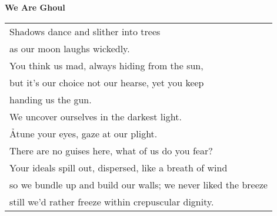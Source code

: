 \documentclass{article}
\begin{document}
\newcommand{\hh}{\hspace*{1ex}}
\begin{center}
\textbf{We Are Ghoul} \\
\vspace*{2ex}
\begin{tabular}{l}
Shadows dance and slither into trees \\
\hh as our moon laughs wickedly. \\
You think us mad, always hiding from the sun, \\
\hh but it's our choice not our hearse, yet you keep \\
\hh handing us the gun. \\
We uncover ourselves in the darkest light. \\
\h Atune your eyes, gaze at our plight. \\ %
There are no guises here, what of us do you fear? \\ %
Your ideals spill out, dispersed, like a breath of wind \\
\hh so we bundle up and build our walls; we never liked the breeze \\
\hh still we'd rather freeze within crepuscular dignity. \\ %
\end{tabular}
\end{center}
\end{document}
